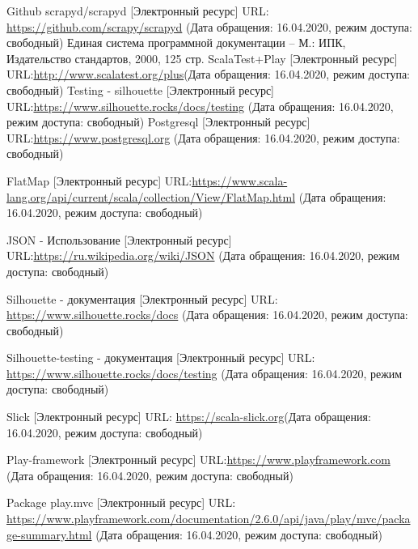 \documentclass[a4paper,12pt]{article}
\begin{document}
	\begin{thebibliography}{7}
		 Github scrapyd/scrapyd [Электронный ресурс] URL: \url{https://github.com/scrapy/scrapyd} (Дата обращения: 16.04.2020, режим доступа: свободный)
		Единая система программной документации – М.: ИПК, Издательство стандартов, 2000, 125 стр.
		 ScalaTest+Play [Электронный ресурс] URL:\url{http://www.scalatest.org/plus}(Дата обращения: 16.04.2020, режим доступа: свободный)
		 Testing - silhouette [Электронный ресурс] URL:\url{https://www.silhouette.rocks/docs/testing} (Дата обращения: 16.04.2020, режим доступа: свободный)
		 Postgresql [Электронный ресурс] URL:\url{https://www.postgresql.org} (Дата обращения: 16.04.2020, режим доступа: свободный)
		
		 FlatMap [Электронный ресурс] URL:\url{https://www.scala-lang.org/api/current/scala/collection/View/FlatMap.html} (Дата обращения: 16.04.2020, режим доступа: свободный)
		
		 JSON - Использование [Электронный ресурс]
		URL:\url{https://ru.wikipedia.org/wiki/JSON} (Дата обращения: 16.04.2020, режим доступа: свободный)
		
		 Silhouette - документация [Электронный ресурс] URL: \url{https://www.silhouette.rocks/docs} (Дата обращения: 16.04.2020, режим доступа: свободный)
		
		 Silhouette-testing - документация [Электронный ресурс] URL: \url{https://www.silhouette.rocks/docs/testing} (Дата обращения: 16.04.2020, режим доступа: свободный)
		
		 Slick [Электронный ресурс] URL: \url{https://scala-slick.org}(Дата обращения: 16.04.2020, режим доступа: свободный)
		
		 Play-framework [Электронный ресурс] URL:\url{https://www.playframework.com} (Дата обращения: 16.04.2020, режим доступа: свободный)
		
		 Package play.mvc [Электронный ресурс] URL: \url{https://www.playframework.com/documentation/2.6.0/api/java/play/mvc/package-summary.html} (Дата обращения: 16.04.2020, режим доступа: свободный)
	\end{thebibliography}
	
						\newpage
	\listRegistration
\end{document}
